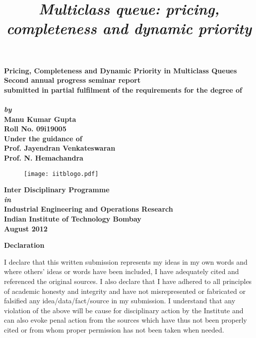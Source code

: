 \documentclass[12pt, a4paper]{report}
\title{\itshape \textbf{Multiclass queue: pricing, completeness and dynamic priority}}
\begin{document}
\thispagestyle{empty}
\pagestyle{plain}
\begin{center} 
{\bf \Large Pricing, Completeness and Dynamic Priority in Multiclass Queues  \\
\vspace{0.25in}
{\normalsize {Second annual progress seminar report}}\\
{\normalsize {submitted in partial fulfilment of the requirements for the degree of}}\\
\vspace*{6mm}{\large  Doctor of Philosophy}\\
\vspace*{3mm}
{\it by}\\
{\Large \bf Manu Kumar Gupta}\\
{\large Roll No. 09i19005}\\
\vspace{.2in}
{\normalfont\normalsize {Under the guidance of}}\\
{\bfseries\Large{Prof. Jayendran Venkateswaran}\\
Prof. N. Hemachandra } \\
\vspace{20mm}
\begin{figure}[h!]
\centering
\texttt{[image: iitblogo.pdf]}  
\end{figure}

\vspace{.125in} %
{\large \bfseries {\normalfont Inter Disciplinary Programme\\
 \textit{in}}\\ 
 {Industrial Engineering and Operations Research}\\
Indian Institute of Technology Bombay\\
August 2012}}
\end{center}

\newpage
\begin{center}
\textbf{Declaration}
\end{center}
I declare that this written submission represents my ideas in my own words and
where others' ideas or words have been included, I have adequately cited and referenced the original sources. I also declare that I have adhered to all principles of
academic honesty and integrity and have not misrepresented or fabricated or falsified
any idea/data/fact/source in my submission. I understand that any violation of the
above will be cause for disciplinary action by the Institute and can also evoke penal
action from the sources which have thus not been properly cited or from whom proper
permission has not been taken when needed.\\
\end{document}

